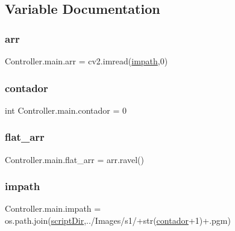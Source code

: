 \subsection{Variable Documentation}
\mbox{\label{namespace_controller_1_1main_adad82d87439471603c309d29ce1fcd16}} 
\subsubsection{\texorpdfstring{arr}{arr}}
{\footnotesize\ttfamily Controller.\+main.\+arr = cv2.\+imread(\hyperlink{namespace_controller_1_1main_ada4e168ced647a0550eb8ae2c15e1037}{impath},0)}

\mbox{\label{namespace_controller_1_1main_a551a13a2be12ee8db7e027437ded21e7}} 
\subsubsection{\texorpdfstring{contador}{contador}}
{\footnotesize\ttfamily int Controller.\+main.\+contador = 0}

\mbox{\label{namespace_controller_1_1main_aedd35c1d9c6106eaec585482a5020709}} 
\subsubsection{\texorpdfstring{flat\+\_\+arr}{flat\_arr}}
{\footnotesize\ttfamily Controller.\+main.\+flat\+\_\+arr = arr.\+ravel()}

\mbox{\label{namespace_controller_1_1main_ada4e168ced647a0550eb8ae2c15e1037}} 
\subsubsection{\texorpdfstring{impath}{impath}}
{\footnotesize\ttfamily Controller.\+main.\+impath = os.\+path.\+join(\hyperlink{namespace_controller_1_1main_afde056e3ffb39cf4210266e4a3c724ec}{script\+Dir},\textquotesingle{}../Images/s1/\textquotesingle{}+str(\hyperlink{namespace_controller_1_1main_a551a13a2be12ee8db7e027437ded21e7}{contador}+1)+\textquotesingle{}.pgm\textquotesingle{})}

